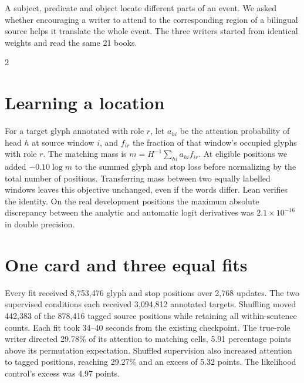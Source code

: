 \newpage
{}
\noindent A subject, predicate and object locate different parts of an event. We asked whether encouraging a writer to attend to the corresponding region of a bilingual source helps it translate the whole event. The three writers started from identical weights and read the same 21 books.
\begin{multicols}{2}
\section*{Learning a location}
For a target glyph annotated with role $r$, let $a_{hi}$ be the attention probability of head $h$ at source window $i$, and $f_{ir}$ the fraction of that window's occupied glyphs with role $r$. The matching mass is $m=H^{-1}\sum_{hi}a_{hi}f_{ir}$. At eligible positions we added $-0.10\log m$ to the summed glyph and stop loss before normalizing by the total number of positions. Transferring mass between two equally labelled windows leaves this objective unchanged, even if the words differ. Lean verifies the identity. On the real development positions the maximum absolute discrepancy between the analytic and automatic logit derivatives was $2.1\times10^{-16}$ in double precision.
\section*{One card and three equal fits}
Every fit received 8,753,476 glyph and stop positions over 2,768 updates. The two supervised conditions each received 3,094,812 annotated targets. Shuffling moved 442,383 of the 878,416 tagged source positions while retaining all within-sentence counts. Each fit took 34--40 seconds from the existing checkpoint. The true-role writer directed 29.78\% of its attention to matching cells, 5.91 percentage points above its permutation expectation. Shuffled supervision also increased attention to tagged positions, reaching 29.27\% and an excess of 5.32 points. The likelihood control's excess was 4.97 points.
\end{multicols}

